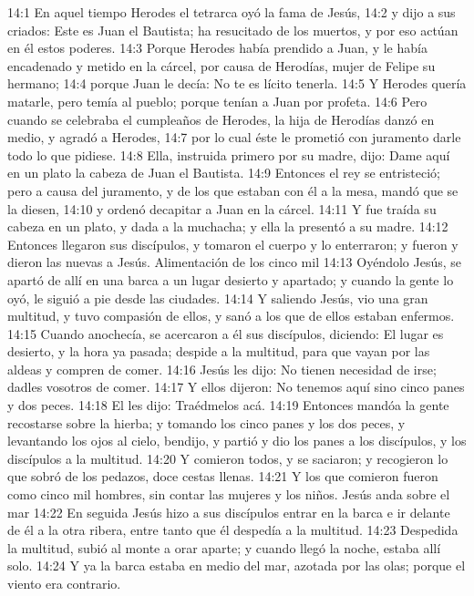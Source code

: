 14:1 En aquel tiempo Herodes el tetrarca oyó la fama de Jesús, 
14:2 y dijo a sus criados: Este es Juan el Bautista; ha resucitado de los muertos, y por eso actúan en él estos poderes. 
14:3 Porque Herodes había prendido a Juan, y le había encadenado y metido en la cárcel, por causa de Herodías, mujer de Felipe su hermano; 
14:4 porque Juan le decía: No te es lícito tenerla. 
14:5 Y Herodes quería matarle, pero temía al pueblo; porque tenían a Juan por profeta. 
14:6 Pero cuando se celebraba el cumpleaños de Herodes, la hija de Herodías danzó en medio, y agradó a Herodes, 
14:7 por lo cual éste le prometió con juramento darle todo lo que pidiese. 
14:8 Ella, instruida primero por su madre, dijo: Dame aquí en un plato la cabeza de Juan el Bautista. 
14:9 Entonces el rey se entristeció; pero a causa del juramento, y de los que estaban con él a la mesa, mandó que se la diesen, 
14:10 y ordenó decapitar a Juan en la cárcel. 
14:11 Y fue traída su cabeza en un plato, y dada a la muchacha; y ella la presentó a su madre. 
14:12 Entonces llegaron sus discípulos, y tomaron el cuerpo y lo enterraron; y fueron y dieron las nuevas a Jesús. 
Alimentación de los cinco mil  
14:13 Oyéndolo Jesús, se apartó de allí en una barca a un lugar desierto y apartado; y cuando la gente lo oyó, le siguió a pie desde las ciudades. 
14:14 Y saliendo Jesús, vio una gran multitud, y tuvo compasión de ellos, y sanó a los que de ellos estaban enfermos. 
14:15 Cuando anochecía, se acercaron a él sus discípulos, diciendo: El lugar es desierto, y la hora ya pasada; despide a la multitud, para que vayan por las aldeas y compren de comer. 
14:16 Jesús les dijo: No tienen necesidad de irse; dadles vosotros de comer. 
14:17 Y ellos dijeron: No tenemos aquí sino cinco panes y dos peces. 
14:18 El les dijo: Traédmelos acá. 
14:19 Entonces mandóa la gente recostarse sobre la hierba; y tomando los cinco panes y los dos peces, y levantando los ojos al cielo, bendijo, y partió y dio los panes a los discípulos, y los discípulos a la multitud. 
14:20 Y comieron todos, y se saciaron; y recogieron lo que sobró de los pedazos, doce cestas llenas. 
14:21 Y los que comieron fueron como cinco mil hombres, sin contar las mujeres y los niños. 
Jesús anda sobre el mar  
14:22 En seguida Jesús hizo a sus discípulos entrar en la barca e ir delante de él a la otra ribera, entre tanto que él despedía a la multitud. 
14:23 Despedida la multitud, subió al monte a orar aparte; y cuando llegó la noche, estaba allí solo. 
14:24 Y ya la barca estaba en medio del mar, azotada por las olas; porque el viento era contrario. 
